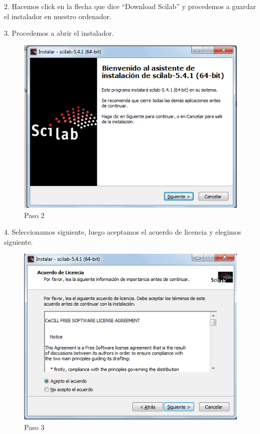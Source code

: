 \documentclass[11pt]{article} %
\begin{document}
2.	Hacemos click en la flecha que dice “Download Scilab” y procedemos a guardar el instalador en nuestro ordenador.

3.	Procedemos a abrir el instalador.

\begin{figure}
  \centering
    \includegraphics{Captura2}
  \caption{Paso 2}
  \label{fig:paso2}
\end{figure}

4.	Seleccionamos siguiente, luego aceptamos el acuerdo de licencia y elegimos siguiente.

\begin{figure}
  \centering
    \includegraphics{Captura3}
  \caption{Paso 3}
  \label{fig:paso3}
\end{figure}
\end{document}
